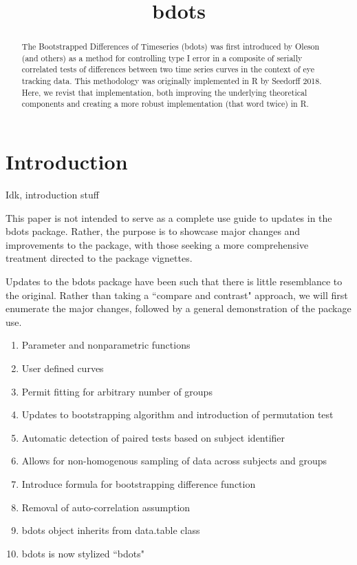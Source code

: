 \documentclass{article}
\title{bdots}
\date{}
\begin{document}

\maketitle

%

\begin{abstract}
The Bootstrapped Differences of Timeseries (bdots) was first introduced by Oleson (and others) as a method for controlling type I error in a composite of serially correlated tests of differences between two time series curves in the context of eye tracking data.  This methodology was originally implemented in R by Seedorff 2018. Here, we revist that implementation, both improving the underlying theoretical components and creating a more robust implementation (that word twice) in R. 
\end{abstract}

\section{Introduction}

Idk, introduction stuff

This paper is not intended to serve as a complete use guide to updates in the bdots package. Rather, the purpose is to showcase major changes and improvements to the package, with those seeking a more comprehensive treatment directed to the package vignettes. 

Updates to the bdots package have been such that there is little resemblance to the original. Rather than taking a ``compare and contrast" approach, we will first enumerate the major changes, followed by a general demonstration of the package use. 

\begin{enumerate}
\item Parameter and nonparametric functions
\item User defined curves
\item Permit fitting for arbitrary number of groups
\item Updates to bootstrapping algorithm and introduction of permutation test
\item Automatic detection of paired tests based on subject identifier
\item Allows for non-homogenous sampling of data across subjects and groups
\item Introduce formula for bootstrapping difference function
\item Removal of auto-correlation assumption
\item bdots object inherits from data.table class
\item bdots is now stylized ``bdots"
\end{enumerate}
\end{document}
